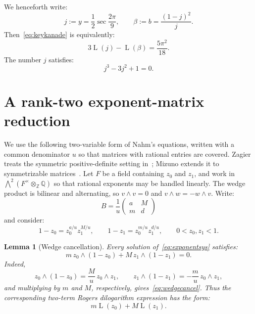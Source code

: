 \documentclass[preprint,12pt,number]{elsarticle}
\newtheorem{lemma}[theorem]{Lemma}
\theoremstyle{remark}
\newcommand{\Lr}{\operatorname{L}}
\begin{document}
\noindent We henceforth write:
\begin{equation}\label{eq:jbeta}
j:=y=\frac12\sec\frac{2\pi}{9},\qquad
\beta:=b=\frac{(1-j)^2}{j}.
\end{equation}
Then~\eqref{eq:keykanade} is equivalently:
\begin{equation}\label{eq:jbetaid}
3\Lr(j)-\Lr(\beta)=\frac{5\pi^2}{18}.
\end{equation}
The number $j$ satisfies:
\begin{equation}\label{eq:jcubic}
j^3-3j^2+1=0.
\end{equation}

\section{A rank-two exponent-matrix reduction}\label{sec:matrix}

We use the following two-variable form of Nahm's equations, written with a common denominator $u$ so that matrices with rational entries are covered. Zagier treats the symmetric positive-definite setting in~\cite{Zagier}; Mizuno extends it to symmetrizable matrices~\cite{Mizuno}.
Let $F$ be a field containing $z_0$ and $z_1$, and work in
$\bigwedge^2(F^\times\otimes_{\mathbb Z}\mathbb Q)$ so that rational
exponents may be handled linearly.  The wedge product is bilinear and
alternating, so $v\wedge v=0$ and $v\wedge w=-w\wedge v$.  Write:
\begin{equation}\label{eq:exponentmatrix}
B=\frac1u\begin{pmatrix}a&M\\ m&d\end{pmatrix}
\end{equation}
and consider:
\begin{equation}\label{eq:exponentsys}
1-z_0=z_0^{a/u}z_1^{M/u},\qquad
1-z_1=z_0^{m/u}z_1^{d/u},\qquad 0<z_0,z_1<1.
\end{equation}

\begin{lemma}[Wedge cancellation]\label{lem:wedge}
Every solution of~\eqref{eq:exponentsys} satisfies:
\begin{equation}\label{eq:wedgecancel}
m\,z_0\wedge(1-z_0)+M\,z_1\wedge(1-z_1)=0.
\end{equation}
Indeed,
\[
z_0\wedge(1-z_0)=\frac{M}{u}\,z_0\wedge z_1,
\qquad
z_1\wedge(1-z_1)=-\frac{m}{u}\,z_0\wedge z_1,
\]
and multiplying by $m$ and $M$, respectively, gives~\eqref{eq:wedgecancel}.
Thus the corresponding two-term Rogers dilogarithm expression has the form:
\begin{equation}\label{eq:twotermform}
m\Lr(z_0)+M\Lr(z_1).
\end{equation}
\end{lemma}
\end{document}
